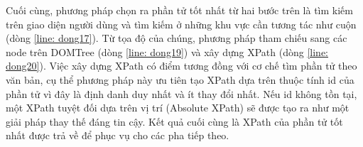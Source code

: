 \documentclass[a4paper, 12pt]{report}
\begin{document}
{Cuối cùng, phương pháp chọn ra phần tử tốt nhất từ hai bước trên là tìm kiếm trên giao diện người dùng và tìm kiếm ở những khu vực cần tương tác như cuộn (dòng \ref{line: dong17}). Từ tọa độ của chúng, phương pháp tham chiếu sang các node trên \gls{DOMTree} (dòng \ref{line: dong19}) và xây dựng XPath (dòng \ref{line: dong20}). Việc xây dựng XPath có điểm tương đồng với cơ chế tìm phần tử theo văn bản, cụ thể phương pháp này ưu tiên tạo XPath dựa trên thuộc tính id của phần tử vì đây là định danh duy nhất và ít thay đổi nhất. Nếu id không tồn tại, một XPath tuyệt đối dựa trên vị trí (Absolute XPath) sẽ được tạo ra như một giải pháp thay thế đáng tin cậy. Kết quả cuối cùng là XPath của phần tử tốt nhất được trả về để phục vụ cho các pha tiếp theo.






        
        
        















}
\end{document}
